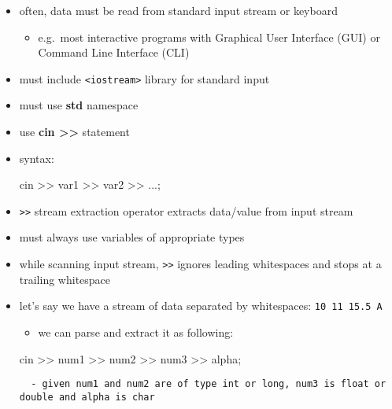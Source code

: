 \documentclass[11pt]{article}
\providecommand{\tightlist}{%
      \setlength{\itemsep}{0pt}\setlength{\parskip}{0pt}}
\newenvironment{Shaded}{}{}
\newcommand{\NormalTok}[1]{{#1}}
\newcommand{\OperatorTok}[1]{\textcolor[rgb]{0.40,0.40,0.40}{{#1}}}
\begin{document}
\begin{itemize}
\item
  often, data must be read from standard input stream or keyboard

  \begin{itemize}
  \tightlist
  \item
    e.g.~most interactive programs with Graphical User Interface (GUI)
    or Command Line Interface (CLI)
  \end{itemize}
\item
  must include \texttt{\textless{}iostream\textgreater{}} library for
  standard input
\item
  must use \textbf{std} namespace
\item
  use \textbf{cin \textgreater\textgreater{}} statement
\item
  syntax:

\begin{Shaded}
\begin{Highlighting}[]
\NormalTok{cin }\OperatorTok{\textgreater{}\textgreater{}}\NormalTok{ var1 }\OperatorTok{\textgreater{}\textgreater{}}\NormalTok{ var2 }\OperatorTok{\textgreater{}\textgreater{}} \OperatorTok{...;}
\end{Highlighting}
\end{Shaded}
\item
  \texttt{\textgreater{}\textgreater{}} stream extraction operator
  extracts data/value from input stream
\item
  must always use variables of appropriate types
\item
  while scanning input stream, \texttt{\textgreater{}\textgreater{}}
  ignores leading whitespaces and stops at a trailing whitespace
\item
  let's say we have a stream of data separated by whitespaces:
  \texttt{10\ 11\ 15.5\ A}

  \begin{itemize}
  \tightlist
  \item
    we can parse and extract it as following:
  \end{itemize}

\begin{Shaded}
\begin{Highlighting}[]
\NormalTok{cin }\OperatorTok{\textgreater{}\textgreater{}}\NormalTok{ num1 }\OperatorTok{\textgreater{}\textgreater{}}\NormalTok{ num2 }\OperatorTok{\textgreater{}\textgreater{}}\NormalTok{ num3 }\OperatorTok{\textgreater{}\textgreater{}}\NormalTok{ alpha}\OperatorTok{;}
\end{Highlighting}
\end{Shaded}

\begin{verbatim}
  - given num1 and num2 are of type int or long, num3 is float or double and alpha is char
\end{verbatim}
\end{itemize}
\end{document}
